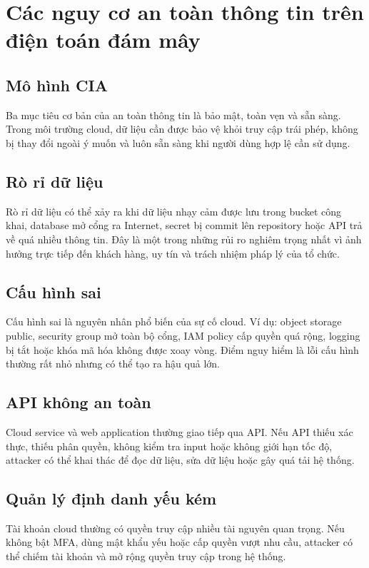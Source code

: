 \chapter{Các nguy cơ an toàn thông tin trên điện toán đám mây}

\section{Mô hình CIA}
Ba mục tiêu cơ bản của an toàn thông tin là bảo mật, toàn vẹn và sẵn sàng. Trong môi trường cloud, dữ liệu cần được bảo vệ khỏi truy cập trái phép, không bị thay đổi ngoài ý muốn và luôn sẵn sàng khi người dùng hợp lệ cần sử dụng.

\section{Rò rỉ dữ liệu}
Rò rỉ dữ liệu có thể xảy ra khi dữ liệu nhạy cảm được lưu trong bucket công khai, database mở cổng ra Internet, secret bị commit lên repository hoặc API trả về quá nhiều thông tin. Đây là một trong những rủi ro nghiêm trọng nhất vì ảnh hưởng trực tiếp đến khách hàng, uy tín và trách nhiệm pháp lý của tổ chức.

\section{Cấu hình sai}
Cấu hình sai là nguyên nhân phổ biến của sự cố cloud. Ví dụ: object storage public, security group mở toàn bộ cổng, IAM policy cấp quyền quá rộng, logging bị tắt hoặc khóa mã hóa không được xoay vòng. Điểm nguy hiểm là lỗi cấu hình thường rất nhỏ nhưng có thể tạo ra hậu quả lớn.

\section{API không an toàn}
Cloud service và web application thường giao tiếp qua API. Nếu API thiếu xác thực, thiếu phân quyền, không kiểm tra input hoặc không giới hạn tốc độ, attacker có thể khai thác để đọc dữ liệu, sửa dữ liệu hoặc gây quá tải hệ thống.

\section{Quản lý định danh yếu kém}
Tài khoản cloud thường có quyền truy cập nhiều tài nguyên quan trọng. Nếu không bật MFA, dùng mật khẩu yếu hoặc cấp quyền vượt nhu cầu, attacker có thể chiếm tài khoản và mở rộng quyền truy cập trong hệ thống.

